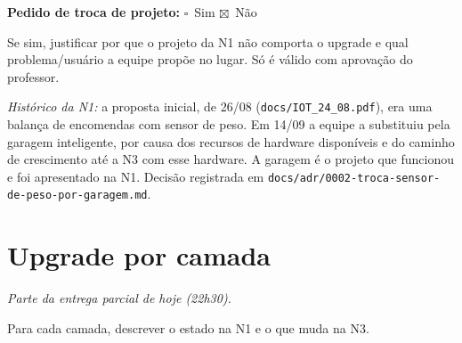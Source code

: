 \documentclass[11pt,a4paper]{article}
\newcommand{\vazio}{$\square$}
\newcommand{\marcado}{$\boxtimes$}
\newcommand{\parcial}{\textit{\small Parte da entrega parcial de hoje (22h30).}\par\medskip}
\newcommand{\cod}[1]{\texttt{#1}}
\begin{document}
\textbf{Pedido de troca de projeto:} \vazio\ Sim \qquad \marcado\ Não

Se sim, justificar por que o projeto da N1 não comporta o upgrade e qual problema/usuário
a equipe propõe no lugar. Só é válido com aprovação do professor.

\textit{Histórico da N1:} a proposta inicial, de 26/08 (\cod{docs/IOT\_24\_08.pdf}), era uma balança
de encomendas com sensor de peso. Em 14/09 a equipe a substituiu pela garagem inteligente, por causa
dos recursos de hardware disponíveis e do caminho de crescimento até a N3 com esse hardware. A garagem
é o projeto que funcionou e foi apresentado na N1. Decisão registrada em
\cod{docs/adr/0002-troca-sensor-de-peso-por-garagem.md}.

\section{Upgrade por camada}
\parcial

Para cada camada, descrever o estado na N1 e o que muda na N3.
\end{document}
